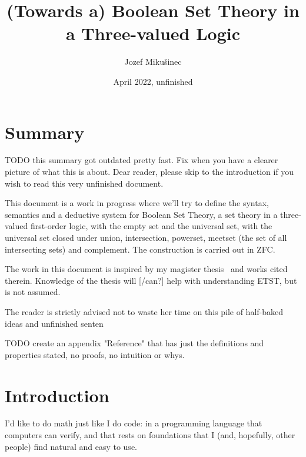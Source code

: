 \documentclass[oneside,12pt]{book}
\title{(Towards a) Boolean Set Theory in a Three-valued Logic}
\author{Jozef Mikušinec}
\date{April 2022, unfinished}
\theoremstyle{definition}
\theoremstyle{remark}
\begin{document}
\frenchspacing

\maketitle
\titleformat{\chapter}{}{}{0em}{\bf\LARGE\thechapter~}


\chapter*{Summary}

TODO this summary got outdated pretty fast. Fix when you have a clearer picture
of what this is about. Dear reader, please skip to the introduction if you
wish to read this very unfinished document.

This document is a work in progress where we'll try to define the syntax, semantics
and a deductive system for Boolean Set Theory, a set theory in a three-valued
first-order
logic, with the empty set and the universal set,
with the universal set closed under union, intersection, powerset, meetset (the set
of all intersecting sets) and complement. The construction is carried out in ZFC.

The work in this document is inspired by my magister thesis~\cite{MikusinecMgrThesis}
and works cited therein. Knowledge of the thesis will [/can?] help with understanding
ETST, but is not assumed.

The reader is strictly advised not to waste her time on this pile of half-baked
ideas and unfinished senten

TODO create an appendix "Reference" that has just the definitions and properties
stated, no proofs, no intuition or whys.


\tableofcontents


\chapter{Introduction}
I'd like to do math just like I do code: in a programming language that computers
can verify, and that rests on foundations that I (and, hopefully, other people)
find natural and easy to use.
\end{document}
